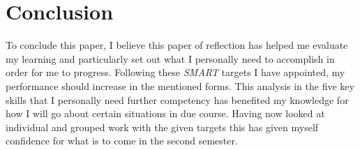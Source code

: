 \documentclass{scrartcl}
\begin{document}
\section{Conclusion}

To conclude this paper, I believe this paper of reflection has helped me evaluate my learning and particularly set out what I personally need to accomplish in order for me to progress. Following these \textit{SMART} targets I have appointed, my performance should increase in the mentioned forms.
This analysis in the five key skills that I personally need further competency has benefited my knowledge for how I will go about certain situations in due course. Having now looked at individual and grouped work with the given targets this has given myself confidence for what is to come in the second semester.





\end{document}
